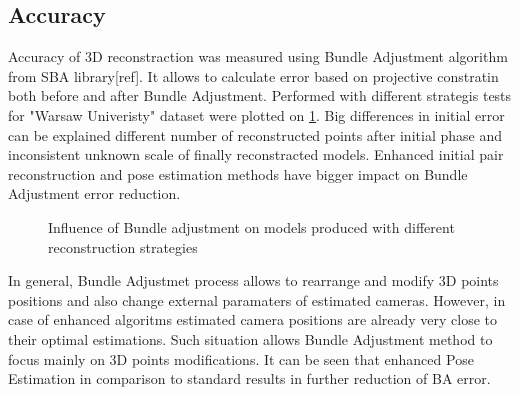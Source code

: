 \subsection{Accuracy}
Accuracy of 3D reconstraction was measured using Bundle Adjustment algorithm from SBA library[ref]. It allows to calculate error based on projective constratin both before and after Bundle Adjustment.
Performed with different strategis tests for "Warsaw Univeristy" dataset were plotted on \ref{plot:BAError}. Big differences in initial error can be explained different number of reconstructed points after initial phase and inconsistent unknown scale of finally reconstracted models. Enhanced initial pair reconstruction and pose estimation methods have bigger impact on Bundle Adjustment error reduction.
\begin{figure}[ht!]
  \begin{center}
    \caption{Influence of Bundle adjustment on models produced with different reconstruction strategies }
    \label{plot:BAError}
  \end{center}
\end{figure}
\clearpage
In general, Bundle Adjustmet process allows to rearrange and modify 3D points positions and also change external paramaters of estimated cameras. However, in case of enhanced algoritms estimated camera positions are already very close to their optimal estimations.  Such situation allows Bundle Adjustment method to focus mainly on 3D points modifications. It can be seen that enhanced Pose Estimation in comparison to standard results in further reduction of BA error. 

